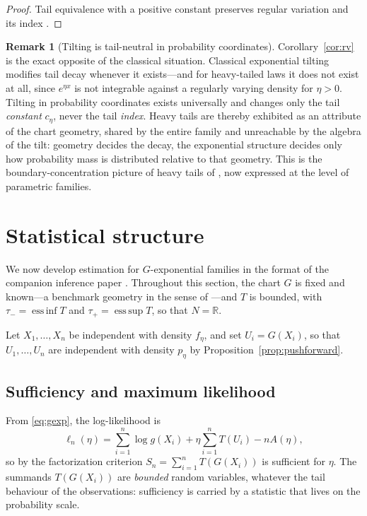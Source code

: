 \documentclass[11pt]{article}
\theoremstyle{definition}
\newtheorem{remark}[theorem]{Remark}
\newcommand{\R}{\mathbb{R}}
\begin{document}
\begin{proof}
Tail equivalence with a positive constant preserves regular variation and
its index \cite{BinghamGoldieTeugels1987}.
\end{proof}

\begin{remark}[Tilting is tail-neutral in probability coordinates]
\label{rem:tail-neutral}
Corollary~\ref{cor:rv} is the exact opposite of the classical situation.
Classical exponential tilting modifies tail decay whenever it exists---and
for heavy-tailed laws it does not exist at all, since $e^{\eta x}$ is not
integrable against a regularly varying density for $\eta>0$. Tilting in
probability coordinates exists universally and changes only the tail
\emph{constant} $c_\eta$, never the tail \emph{index}. Heavy tails are
thereby exhibited as an attribute of the chart geometry, shared by the
entire family and unreachable by the algebra of the tilt: geometry decides
the decay, the exponential structure decides only how probability mass is
distributed relative to that geometry. This is the boundary-concentration
picture of heavy tails of \cite{Cojocea2026a}, now expressed at the level
of parametric families.
\end{remark}

\section{Statistical structure}\label{sec:inference}

We now develop estimation for $G$-exponential families in the format of
the companion inference paper \cite{Cojocea2026b}. Throughout this
section, the chart $G$ is fixed and known---a benchmark geometry in the
sense of \cite{Cojocea2026a,Cojocea2026b}---and $T$ is bounded, with
$\tau_-=\operatorname{ess\,inf}T$ and $\tau_+=\operatorname{ess\,sup}T$,
so that $N=\R$.

Let $X_1,\dots,X_n$ be independent with density $f_\eta$, and set
$U_i=G(X_i)$, so that $U_1,\dots,U_n$ are independent with density
$p_\eta$ by Proposition~\ref{prop:pushforward}.

\subsection{Sufficiency and maximum likelihood}

From \eqref{eq:gexp}, the log-likelihood is
\begin{equation}\label{eq:loglik}
\ell_n(\eta)
=\sum_{i=1}^n\log g(X_i)
+\eta\sum_{i=1}^n T(U_i)-nA(\eta),
\end{equation}
so by the factorization criterion $S_n=\sum_{i=1}^n T(G(X_i))$ is
sufficient for $\eta$. The summands $T(G(X_i))$ are \emph{bounded} random
variables, whatever the tail behaviour of the observations: sufficiency is
carried by a statistic that lives on the probability scale.
\end{document}
